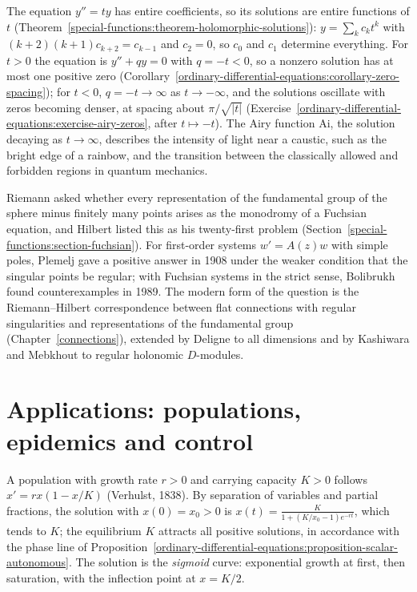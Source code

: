 \begin{example}\label{ordinary-differential-equations:example-airy}
The equation $y'' = ty$ has entire coefficients, so its solutions are entire functions of $t$ (Theorem~\ref{special-functions:theorem-holomorphic-solutions}): $y = \sum_kc_kt^k$ with $(k + 2)(k + 1)c_{k+2} = c_{k-1}$ and $c_2 = 0$, so $c_0$
and $c_1$ determine everything. For $t > 0$ the equation is $y'' + qy = 0$ with $q = -t < 0$, so a nonzero solution has at most one positive zero (Corollary~\ref{ordinary-differential-equations:corollary-zero-spacing}); for
$t < 0$, $q = -t \to \infty$ as $t \to -\infty$, and the solutions oscillate with zeros becoming denser, at spacing about $\pi/\sqrt{|t|}$ (Exercise~\ref{ordinary-differential-equations:exercise-airy-zeros}, after $t \mapsto -t$). The
Airy function $\mathrm{Ai}$, the solution decaying as $t \to \infty$, describes the intensity of light near a caustic, such as the bright edge of a rainbow, and the transition between the classically allowed and forbidden regions in
quantum mechanics.
\end{example}

\begin{remark}\label{ordinary-differential-equations:remark-riemann-hilbert}
Riemann asked whether every representation of the fundamental group of the sphere minus finitely many points arises as the monodromy of a Fuchsian equation, and Hilbert listed this as his twenty-first problem
(Section~\ref{special-functions:section-fuchsian}). For first-order systems $w' = A(z)w$ with simple poles, Plemelj gave a positive answer in 1908 under the weaker condition that the singular points be regular; with Fuchsian
systems in the strict sense, Bolibrukh found counterexamples in 1989. The modern form of the question is the Riemann--Hilbert correspondence between flat connections with regular singularities and representations of the
fundamental group (Chapter~\ref{connections}), extended by Deligne to all dimensions and by Kashiwara and Mebkhout to regular holonomic $D$-modules.
\end{remark}

\section{Applications: populations, epidemics and control}\label{ordinary-differential-equations:section-applications}

\begin{example}\label{ordinary-differential-equations:example-logistic}
A population with growth rate $r > 0$ and carrying capacity $K > 0$ follows $x' = rx(1 - x/K)$ (Verhulst, 1838). By separation of variables and partial fractions, the solution with $x(0) = x_0 > 0$ is
$x(t) = \frac{K}{1 + (K/x_0 - 1)e^{-rt}}$, which tends to $K$; the equilibrium $K$ attracts all positive solutions, in accordance with the phase line of Proposition~\ref{ordinary-differential-equations:proposition-scalar-autonomous}. The
solution is the \emph{sigmoid} curve: exponential growth at first, then saturation, with the inflection point at $x = K/2$.
\end{example}

